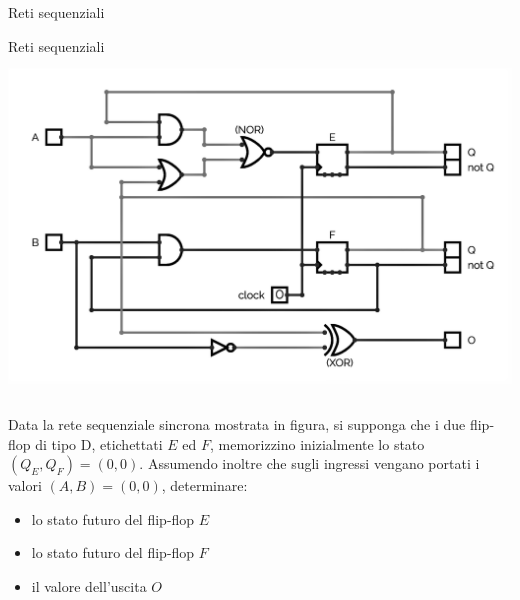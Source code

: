 \documentclass[11pt]{article}
\begin{document}
\begin{quiz}{Reti sequenziali}
\begin{cloze}[points=1,shuffle=false]{Reti sequenziali}
    \includegraphics[height=9cm]{figures/seq_2.png}
    
    Data la rete sequenziale sincrona mostrata in figura, si supponga che i due flip-flop di tipo D,
    etichettati $E$ ed $F$, memorizzino inizialmente lo stato $(Q_E,Q_F) = (0,0)$.
    Assumendo inoltre che sugli ingressi vengano portati i valori $(A,B)=(0,0)$,
    determinare:
    
    \begin{itemize}
    \item lo stato futuro del flip-flop $E$ 
    \item lo stato futuro del flip-flop $F$ 
    \item il valore dell'uscita $O$ 
    \end{itemize}
\end{cloze}



\end{quiz}
\end{document}
